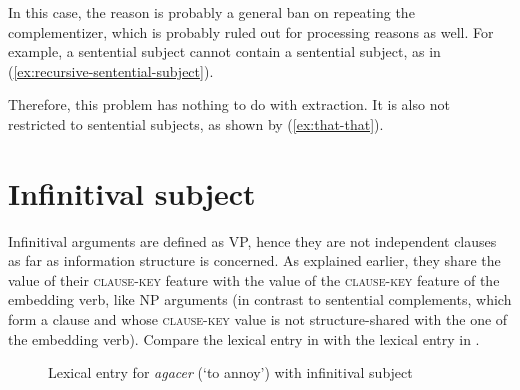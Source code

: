 In this case, the reason is probably a general ban on repeating the complementizer, which is probably ruled out for processing reasons as well. For example, a sentential subject cannot contain a sentential subject, as in (\ref{ex:recursive-sentential-subject}). 

\eal \label{ex:recursive-sentential-subject}
\zl 

Therefore, this problem has nothing to do with extraction. It is also not restricted to sentential subjects, as shown by (\ref{ex:that-that}). 

\label{ex:that-that}
\z  

\section{Infinitival subject}

Infinitival arguments are defined as VP, hence they are not independent clauses as far as information structure is concerned. As explained earlier, they share the value of their \textsc{clause-key} feature with the value of the \textsc{clause-key} feature of the embedding verb, like NP arguments (in contrast to sentential complements, which form a clause and whose \textsc{clause-key} value is not structure-shared with the one of the embedding verb). Compare the lexical entry in  with the lexical entry in .

\begin{figure}[h]
\caption{Lexical entry for \emph{agacer} (`to annoy') with infinitival subject}
\label{ex:avm-agacer-inf}
\end{figure}

